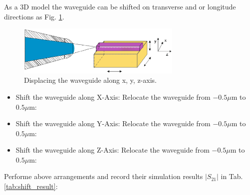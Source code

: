 As a 3D model the waveguide can be shifted on transverse and or longitude directions as Fig. \ref{fig:shift_all_axis}.
\begin{figure}[!ht]
\centering
\includegraphics[width=0.7\textwidth]{bilder/shift_all_axis}
\caption{Displacing the waveguide along x, y, z-axis.}
\label{fig:shift_all_axis}
\end{figure}

\begin{itemize}
\item Shift the waveguide along X-Axis: Relocate the waveguide from $-0.5\mu$m to $0.5\mu$m:
\item Shift the waveguide along Y-Axis: Relocate the waveguide from $-0.5\mu$m to $0.5\mu$m:
\item Shift the waveguide along Z-Axis: Relocate the waveguide from $-0.5\mu$m to $0.5\mu$m:
\end{itemize}
Performe above arrangements and record their simulation results $|S_{21}|$ in Tab. \ref{tab:shift_result}:\\

